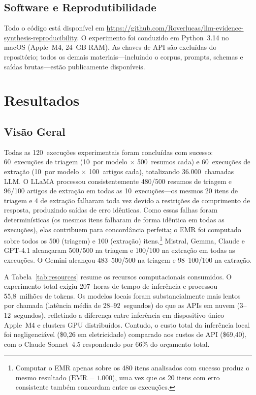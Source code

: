 \documentclass[12pt, a4paper]{article}
\newcommand{\emr}{\textrm{EMR}}
\begin{document}
\subsection{Software e Reprodutibilidade}

Todo o código está disponível em \url{https://github.com/Roverlucas/llm-evidence-synthesis-reproducibility}.
O experimento foi conduzido em Python~3.14 no macOS (Apple~M4, 24~GB RAM).
As chaves de API são excluídas do repositório; todos os demais materiais---incluindo o corpus, prompts, schemas e saídas brutas---estão publicamente disponíveis.


\section{Resultados}

\subsection{Visão Geral}

Todas as 120~execuções experimentais foram concluídas com sucesso: 60~execuções de triagem (10~por modelo $\times$ 500~resumos cada) e 60~execuções de extração (10~por modelo $\times$ 100~artigos cada), totalizando 36.000~chamadas LLM.
O LLaMA processou consistentemente 480/500 resumos de triagem e 96/100 artigos de extração em todas as 10~execuções---os mesmos 20 itens de triagem e 4 de extração falharam toda vez devido a restrições de comprimento de resposta, produzindo saídas de erro idênticas.
Como essas falhas foram determinísticas (os mesmos itens falharam de forma idêntica em todas as execuções), elas contribuem para concordância perfeita; o EMR foi computado sobre todos os 500 (triagem) e 100 (extração) itens.\footnote{Computar o EMR apenas sobre os 480 itens analisados com sucesso produz o mesmo resultado ($\emr{=}1.000$), uma vez que os 20 itens com erro consistente também concordam entre as execuções.}
Mistral, Gemma, Claude e GPT-4.1 alcançaram 500/500 na triagem e 100/100 na extração em todas as execuções.
O Gemini alcançou 483--500/500 na triagem e 98--100/100 na extração.

A Tabela~\ref{tab:resources} resume os recursos computacionais consumidos.
O experimento total exigiu 207~horas de tempo de inferência e processou 55,8~milhões de tokens.
Os modelos locais foram substancialmente mais lentos por chamada (latência média de 28--92~segundos) do que as APIs em nuvem (3--12~segundos), refletindo a diferença entre inferência em dispositivo único Apple~M4 e clusters GPU distribuídos.
Contudo, o custo total da inferência local foi negligenciável (\$0,26 em eletricidade) comparado aos custos de API (\$69,40), com o Claude Sonnet~4.5 respondendo por 66\% do orçamento total.
\end{document}
